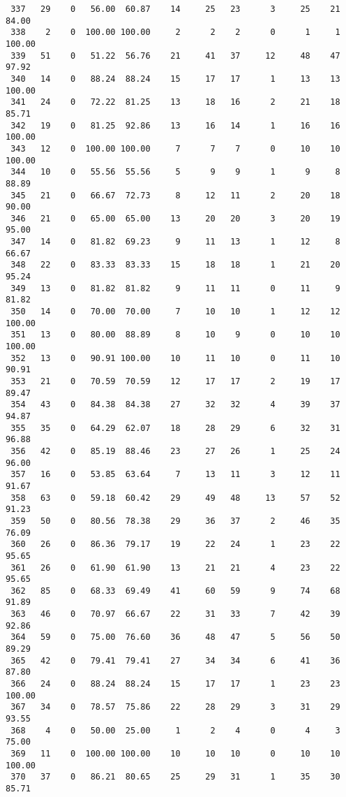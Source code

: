 \begin{verbatim}
 337   29    0   56.00  60.87    14     25   23      3     25    21    84.00
 338    2    0  100.00 100.00     2      2    2      0      1     1   100.00
 339   51    0   51.22  56.76    21     41   37     12     48    47    97.92
 340   14    0   88.24  88.24    15     17   17      1     13    13   100.00
 341   24    0   72.22  81.25    13     18   16      2     21    18    85.71
 342   19    0   81.25  92.86    13     16   14      1     16    16   100.00
 343   12    0  100.00 100.00     7      7    7      0     10    10   100.00
 344   10    0   55.56  55.56     5      9    9      1      9     8    88.89
 345   21    0   66.67  72.73     8     12   11      2     20    18    90.00
 346   21    0   65.00  65.00    13     20   20      3     20    19    95.00
 347   14    0   81.82  69.23     9     11   13      1     12     8    66.67
 348   22    0   83.33  83.33    15     18   18      1     21    20    95.24
 349   13    0   81.82  81.82     9     11   11      0     11     9    81.82
 350   14    0   70.00  70.00     7     10   10      1     12    12   100.00
 351   13    0   80.00  88.89     8     10    9      0     10    10   100.00
 352   13    0   90.91 100.00    10     11   10      0     11    10    90.91
 353   21    0   70.59  70.59    12     17   17      2     19    17    89.47
 354   43    0   84.38  84.38    27     32   32      4     39    37    94.87
 355   35    0   64.29  62.07    18     28   29      6     32    31    96.88
 356   42    0   85.19  88.46    23     27   26      1     25    24    96.00
 357   16    0   53.85  63.64     7     13   11      3     12    11    91.67
 358   63    0   59.18  60.42    29     49   48     13     57    52    91.23
 359   50    0   80.56  78.38    29     36   37      2     46    35    76.09
 360   26    0   86.36  79.17    19     22   24      1     23    22    95.65
 361   26    0   61.90  61.90    13     21   21      4     23    22    95.65
 362   85    0   68.33  69.49    41     60   59      9     74    68    91.89
 363   46    0   70.97  66.67    22     31   33      7     42    39    92.86
 364   59    0   75.00  76.60    36     48   47      5     56    50    89.29
 365   42    0   79.41  79.41    27     34   34      6     41    36    87.80
 366   24    0   88.24  88.24    15     17   17      1     23    23   100.00
 367   34    0   78.57  75.86    22     28   29      3     31    29    93.55
 368    4    0   50.00  25.00     1      2    4      0      4     3    75.00
 369   11    0  100.00 100.00    10     10   10      0     10    10   100.00
 370   37    0   86.21  80.65    25     29   31      1     35    30    85.71

\end{verbatim}
